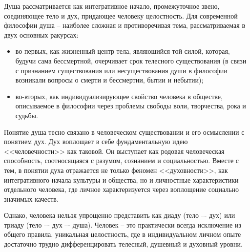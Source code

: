 Душа рассматривается как интегративное начало, промежуточное звено, соединяющее тело и дух, придающее 
человеку целостность. Для современной философии душа – наиболее сложная и противоречивая тема, 
рассматриваемая в двух основных ракурсах:
\begin{itemize}
    \item во-первых, как жизненный центр тела, являющийся той силой, которая, будучи сама бессмертной, 
        очерчивает срок телесного существования (в связи с признанием существования или несуществования души 
        в философии возникали вопросы о смерти и бессмертии, бытии и небытии);
    \item во-вторых, как индивидуализирующее свойство человека в обществе, описываемое в философии через 
        проблемы свободы воли, творчества, рока и судьбы.
\end{itemize}

Понятие душа тесно связано в человеческом существовании и его осмыслении с понятием дух. Дух воплощает в себе 
фундаментальную идею <<человечности>> как таковой. Он выступает как родовая человеческая способность, 
соотносящаяся с разумом, сознанием и социальностью. Вместе с тем, в понятии духа отражается не только феномен 
<<духовности>>, как интегративного начала культуры и общества, но и личностные характеристики отдельного 
человека, где личное характеризуется через воплощение социально значимых качеств.

Однако, человека нельзя упрощенно представить как диаду (тело –- дух) или триаду (тело –- дух –- душа). 
Человек -- это практически всегда исключение из общего правила, уникальная целостность, где в индивидуальном 
личном опыте достаточно трудно дифференцировать телесный, душевный и духовный уровни. 